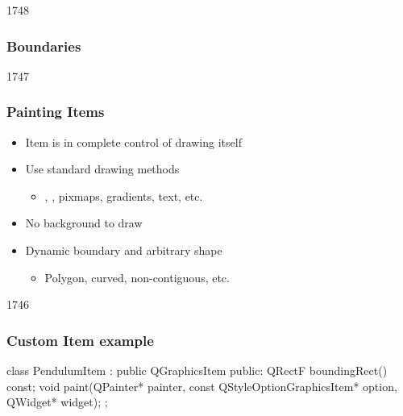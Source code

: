 
\begin{slide}{1748}

\frametitle{Boundaries}
\end{slide}



\begin{slide}{1747}

\frametitle{Painting Items}
\begin{itemize}
\item Item is in complete control of drawing itself
\item Use standard  drawing methods

    \begin{itemize}
    \item {}, , pixmaps, gradients, text, etc.

    \end{itemize}
\item No background to draw

\item Dynamic boundary and arbitrary shape
    \begin{itemize}
    \item Polygon, curved, non-contiguous, etc.
    \end{itemize}
\end{itemize}

\end{slide}




\begin{slide}[fragile]{1746}


\frametitle{Custom Item example}
\begin{cpp}

class PendulumItem : public QGraphicsItem {
public:
    QRectF boundingRect() const;
    void paint(QPainter* painter,
               const QStyleOptionGraphicsItem* option,
               QWidget* widget);
};

\end{cpp}
\begin{columns}[t]
\begin{column}{10mm}
\end{column}
\begin{column}{10mm}
\end{column}
\end{columns}
\end{slide}

